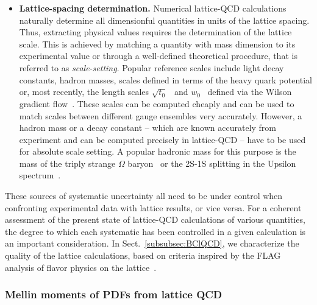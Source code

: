 \begin{itemize}
\item {\bfseries Lattice-spacing determination.} 
Numerical lattice-QCD calculations naturally determine all dimensionful 
quantities in units of the lattice spacing. 
%
Thus, extracting physical values requires the determination of the lattice 
scale. 
%
This is achieved by matching a quantity with mass dimension to its experimental 
value or through a well-defined theoretical procedure, that is referred to as
{\it scale-setting}. 
%
Popular reference scales include light decay constants, hadron masses, 
scales defined in terms of the heavy quark potential or, most recently, 
the length scales $\sqrt{t_0}$~\cite{Luscher:2010iy} and 
$w_0$~\cite{Borsanyi:2012zs} defined via the Wilson  gradient 
flow~\cite{Luscher:2010iy}. 
%
These scales can be computed cheaply and can be used to 
match scales between different gauge ensembles very accurately.  
%
However, a hadron mass or a decay constant -- which are known accurately 
from experiment and can be computed precisely in lattice-QCD -- 
have to be used for absolute scale setting. 
%
A popular hadronic mass for this purpose is the mass of the triply strange 
$\Omega$ baryon~\cite{Durr:2008zz} or the 2S-1S splitting in the Upsilon 
spectrum~\cite{Kendall:2008zz}.

\end{itemize}

These sources of systematic uncertainty all need to be under control
when confronting experimental data with lattice results, or vice
versa.
%
For a coherent assessment of the present state of lattice-QCD
calculations of various quantities, the degree to which each
systematic has been controlled in a given calculation is an important
consideration.
%
In Sect.~\ref{subsubsec:BClQCD}, we characterize the
quality of the lattice calculations, based on criteria inspired by the
FLAG analysis of flavor physics on the lattice~\cite{Aoki:2016frl}.

\subsubsection{Mellin moments of PDFs from lattice QCD}
\label{Sec:MomentsLQCD}

